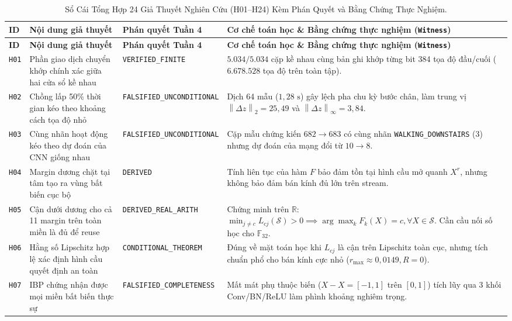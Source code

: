 \documentclass[11pt,a4paper]{article}
\newcommand{\R}{\mathbb{R}}
\newcommand{\F}{\mathbb{F}}
\newcommand{\norm}[1]{\left\lVert #1\right\rVert}
\newcommand{\code}[1]{{\small\ttfamily\nolinkurl{#1}}}
\newcommand{\Sset}{\mathcal{S}}
\theoremstyle{remark}
\begin{document}
{\footnotesize
\begin{longtable}{@{}p{0.8cm}p{4.3cm}p{2.9cm}p{7.2cm}@{}}
\caption{Sổ Cái Tổng Hợp 24 Giả Thuyết Nghiên Cứu (H01--H24) Kèm Phán Quyết và Bằng Chứng Thực Nghiệm.}
\label{tab:ledger24_vi}\\
\toprule
\textbf{ID} & \textbf{Nội dung giả thuyết} & \textbf{Phán quyết Tuần 4} & \textbf{Cơ chế toán học \& Bằng chứng thực nghiệm (\code{Witness})} \\
\midrule
\endfirsthead
\toprule
\textbf{ID} & \textbf{Nội dung giả thuyết} & \textbf{Phán quyết Tuần 4} & \textbf{Cơ chế toán học \& Bằng chứng thực nghiệm (\code{Witness})} \\
\midrule
\endhead
\bottomrule
\endfoot
\code{H01} & Phần giao dịch chuyển khớp chính xác giữa hai cửa sổ kề nhau & \code{VERIFIED\_FINITE} & $5.034/5.034$ cặp kề nhau cùng bản ghi khớp từng bit 384 tọa độ đầu/cuối ($6.678.528$ tọa độ trên toàn tập). \\
\code{H02} & Chồng lấp 50\% thời gian kéo theo khoảng cách tọa độ nhỏ & \code{FALSIFIED\_UNCONDITIONAL} & Dịch 64 mẫu ($1,28\text{ s}$) gây lệch pha chu kỳ bước chân, làm trung vị $\norm{\Delta z}_2 = 25,49$ và $\norm{\Delta z}_\infty = 3,84$. \\
\code{H03} & Cùng nhãn hoạt động kéo theo dự đoán của CNN giống nhau & \code{FALSIFIED\_UNCONDITIONAL} & Cặp mẫu chứng kiến $682 \to 683$ có cùng nhãn \code{WALKING\_DOWNSTAIRS} (3) nhưng dự đoán của mạng đổi từ $10 \to 8$. \\
\code{H04} & Margin dương chặt tại tâm tạo ra vùng bất biến cục bộ & \code{DERIVED} & Tính liên tục của hàm $F$ bảo đảm tồn tại hình cầu mở quanh $X^r$, nhưng không bảo đảm bán kính đủ lớn trên stream. \\
\code{H05} & Cận dưới dương cho cả 11 margin trên toàn miền là đủ để reuse & \code{DERIVED\_REAL\_ARITH} & Chứng minh trên $\R$: $\min_{j \neq c} L_{cj}(\Sset) > 0 \implies \arg\max_k F_k(X) = c, \forall X \in \Sset$. Cần cầu nối số học cho $\F_{32}$. \\
\code{H06} & Hằng số Lipschitz hợp lệ xác định hình cầu quyết định an toàn & \code{CONDITIONAL\_THEOREM} & Đúng về mặt toán học khi $L_{cj}$ là cận trên Lipschitz toàn cục, nhưng tích chuẩn phổ cho bán kính cực nhỏ ($r_{\max} \approx 0,0149, R=0$). \\
\code{H07} & IBP chứng nhận được mọi miền bất biến thực sự & \code{FALSIFIED\_COMPLETENESS} & Mất mát phụ thuộc biến ($X - X = [-1,1]$ trên $[0,1]$) tích lũy qua 3 khối Conv/BN/ReLU làm phình khoảng nghiêm trọng. \\

\end{longtable}}
\end{document}
